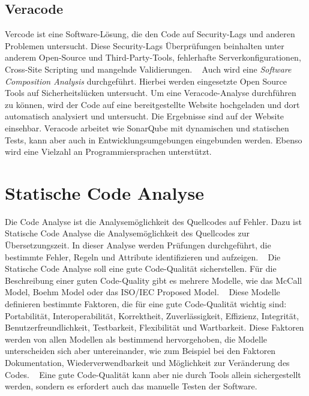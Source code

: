 \subsection{Veracode}
Vercode ist eine Software-Lösung, die den Code auf Security-Lags und anderen Problemen untersucht. Diese Security-Lags Überprüfungen beinhalten unter anderem Open-Source und Third-Party-Tools, fehlerhafte Serverkonfigurationen, Cross-Site Scripting und mangelnde Validierungen. ~\parencite{veracodeSecurity}  Auch wird eine \textit{Software Composition Analysis} durchgeführt. Hierbei werden eingesetzte Open Source Tools auf Sicherheitslücken untersucht. Um eine Veracode-Analyse durchführen zu können, wird der Code auf eine bereitgestellte Website hochgeladen und dort automatisch analysiert und untersucht. Die Ergebnisse sind auf der Website einsehbar. Veracode arbeitet wie SonarQube mit dynamischen und statischen Tests, kann aber auch in Entwicklungsumgebungen eingebunden werden. Ebenso wird eine Vielzahl an Programmiersprachen unterstützt.  ~\parencite{veracodeDig}  

\section{Statische Code Analyse}
Die Code Analyse ist die Analysemöglichkeit des Quellcodes auf Fehler. Dazu ist Statische Code Analyse die Analysemöglichkeit des Quellcodes zur Übersetzungszeit. In dieser Analyse werden Prüfungen durchgeführt, die bestimmte Fehler, Regeln und Attribute identifizieren und aufzeigen. ~\parencite{gomes2009overview}
Die Statische Code Analyse soll eine gute Code-Qualität sicherstellen. Für die Beschreibung einer guten Code-Quality gibt es mehrere Modelle, wie das McCall Model, Boehm Model oder das ISO/IEC Proposed Model. ~\parencite{al2011software} Diese Modelle definieren bestimmte Faktoren, die für eine gute Code-Qualität wichtig sind: Portabilität, Interoperabilität, Korrektheit, Zuverlässigkeit, Effizienz, Integrität, Benutzerfreundlichkeit, Testbarkeit, Flexibilität und Wartbarkeit. \parencite{iqbalCodeQualityApproach} Diese Faktoren werden von allen Modellen als bestimmend hervorgehoben, die Modelle unterscheiden sich aber untereinander, wie zum Beispiel bei den Faktoren Dokumentation, Wiederverwendbarkeit und Möglichkeit zur Veränderung des Codes. ~\parencite{boukouchiModels}
Eine gute Code-Qualität kann aber nie durch Tools allein sichergestellt werden, sondern es erfordert auch das manuelle Testen der Software. 

